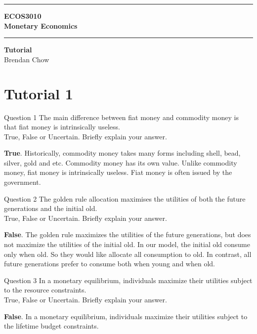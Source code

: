 \documentclass[a4paper]{article}
\newif\IfInSansMode
\numberwithin{equation}{section}
\numberwithin{figure}{section}
\begin{document}
\begin{titlepage}
	\centering
	\vspace*{4.5cm}
	\rule{\linewidth}{2pt}
	\LARGE\textbf{ECOS3010}\\
	\vspace{0.5cm}
	\Huge\textbf{Monetary Economics}\\
	\rule{\linewidth}{2pt}
	\LARGE\textbf{ Tutorial}\\
	\vspace{1.5cm}
	\Large Brendan Chow
	\vfill
\end{titlepage}
\section{Tutorial 1}
	\begin{questionbox}{Question 1}
		The main difference between fiat money and commodity money is that fiat money is intrinsically useless.\\
		True, False or Uncertain. Briefly explain your answer.
		\begin{explanationbox}
			\textbf{True}. Historically, commodity money takes many forms including shell, bead, silver, gold and etc. Commodity money has its own value. Unlike commodity money, fiat money is intrinsically useless. Fiat money is often issued by the government.
		\end{explanationbox}
	\end{questionbox}
	\begin{questionbox}{Question 2}
		The golden rule allocation maximises the utilities of both the future generations and the initial old.\\
		True, False or Uncertain. Briefly explain your answer.
		\begin{explanationbox}
			\textbf{False}. The golden rule maximizes the utilities of the future generations, but does not maximize the utilities of the initial old. In our model, the initial old consume only when old. So they would like allocate all consumption to old. In contrast, all future generations prefer to consume both when young and when old.
		\end{explanationbox}
	\end{questionbox}
	\begin{questionbox}{Question 3}
		In a monetary equilibrium, individuals maximize their utilities subject to the resource constraints.\\
		True, False or Uncertain. Briefly explain your answer.
		\begin{explanationbox}
			\textbf{False}. In a monetary equilibrium, individuals maximize their utilities subject to the lifetime budget constraints.
		\end{explanationbox}
	\end{questionbox}
\end{document}
